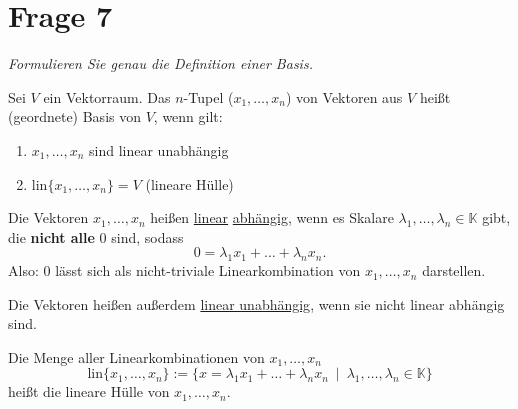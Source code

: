 \section{Frage 7}
\textit{Formulieren Sie genau die Definition einer Basis.}

\begin{definition}[Basis]
    Sei $V$ ein Vektorraum. Das $n$-Tupel ($x_1, \dots, x_n$) von Vektoren aus $V$ heißt
    (geordnete) Basis von $V$, wenn gilt:
    \begin{enumerate}
        \item $x_1,\dots,x_n$ sind linear unabhängig
        \item $\mathrm{lin}\{x_1,\dots,x_n\} = V$ (lineare Hülle)
    \end{enumerate}
\end{definition}
\begin{definition}
    Die Vektoren $x_1,\dots,x_n$ heißen \underline{linear} \underline{abhängig}, wenn es Skalare
    $\lambda_1,\dots,\lambda_n\in \mathbb{K}$ gibt, die \textbf{nicht alle} $0$ sind, sodass
    \[
        0 = \lambda_1 x_1 + \dots + \lambda_n x_n.
    \]
    Also: $0$ lässt sich als nicht-triviale Linearkombination von $x_1,\dots,x_n$ dar\-stellen.

    Die Vektoren heißen außerdem \underline{linear unabhängig}, wenn sie nicht linear abhängig
    sind.
\end{definition}
\begin{definition}
    Die Menge aller Linearkombinationen von $x_1,\dots,x_n$
    \[
        \mathrm{lin}\{x_1,\dots,x_n\} := \{
            x = \lambda_1 x_1 + \dots + \lambda_n x_n\ \mid\ \lambda_1,\dots,\lambda_n\in \mathbb{K}
        \}
    \]
    heißt die lineare Hülle von $x_1,\dots,x_n$.
\end{definition}